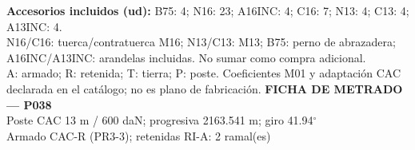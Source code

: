 \begingroup\scriptsize
\textbf{Accesorios incluidos (ud):} B75: 4; N16: 23; A16INC: 4; C16: 7; N13: 4; C13: 4; A13INC: 4.\\
N16/C16: tuerca/contratuerca M16; N13/C13: M13; B75: perno de abrazadera; A16INC/A13INC: arandelas incluidas. No sumar como compra adicional.\\
A: armado; R: retenida; T: tierra; P: poste. Coeficientes M01 y adaptación CAC declarada en el catálogo; no es plano de fabricación.
\endgroup\endgroup
\clearpage{}
\begingroup\small\setlength{\parskip}{3pt}\renewcommand{\arraystretch}{1.05}
\textbf{\large FICHA DE METRADO — P038}\\[4pt]
Poste CAC 13 m / 600 daN; progresiva 2163.541 m; giro 41.94\ensuremath{^\circ}\\
Armado CAC-R (PR3-3); retenidas RI-A: 2 ramal(es)\\
\begingroup\scriptsize
